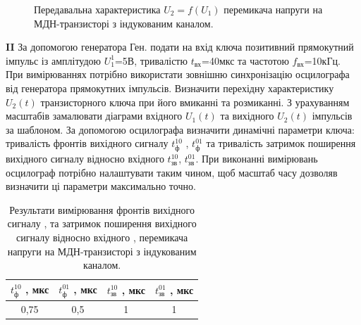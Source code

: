 \documentclass[a4paper,14pt]{extreport}
\begin{document}
 
\begin{figure}[h!]
	\caption{Передавальна характеристика $U_2 = f(U_1)$ перемикача напруги на МДН-транзисторі з індукованим каналом.}
	\label{ris3}
\end{figure}

\textbf{II} За допомогою генератора Ген. подати на вхід ключа позитивний прямокутний імпульс із амплітудою $U_1^1$=5В, тривалістю $t_{\text{вх}}$=40мкс та частотою $f_{\text{вх}}$=10кГц.
При вимірюваннях потрібно використати зовнішню синхронізацію осцилографа від генератора прямокутних імпульсів.
Визначити перехідну характеристику $U_2(t)$ транзисторного ключа при його вмиканні та розмиканні. З урахуванням масштабів замалювати діаграми вхідного $U_1(t)$  та вихідного $U_2(t)$  імпульсів за шаблоном. За допомогою осцилографа визначити динамічні параметри ключа: тривалість фронтів вихідного сигналу $t_{\text{ф}}^{10}$ , $t_{\text{ф}}^{01}$ та тривалість затримок поширення вихідного сигналу відносно вхідного $t_{\text{зв}}^{10}$, $t_{\text{зв}}^{01}$. При виконанні вимірювань осцилограф потрібно налаштувати таким чином, щоб масштаб часу дозволяв визначити ці параметри максимально точно.

\begin{table}[h]
	\begin{center}
	\caption{Результати вимірювання фронтів вихідного сигналу ,  та затримок поширення вихідного сигналу відносно вхідного ,  перемикача напруги на МДН-транзисторі з індукованим каналом.}
		\begin{tabular}{|c|c|c|c|}
			\hline
			 $t_{\text{ф}}^{10}$ , мкс& $t_{\text{ф}}^{01}$ , мкс &$t_{\text{зв}}^{10}$ , мкс  & $t_{\text{зв}}^{01}$ , мкс \\ \hline
			 0,75& 0,5 &  1& 1 \\ \hline
		\end{tabular}
		
		\label{tab4}
	\end{center}
\end{table}
\end{document}
